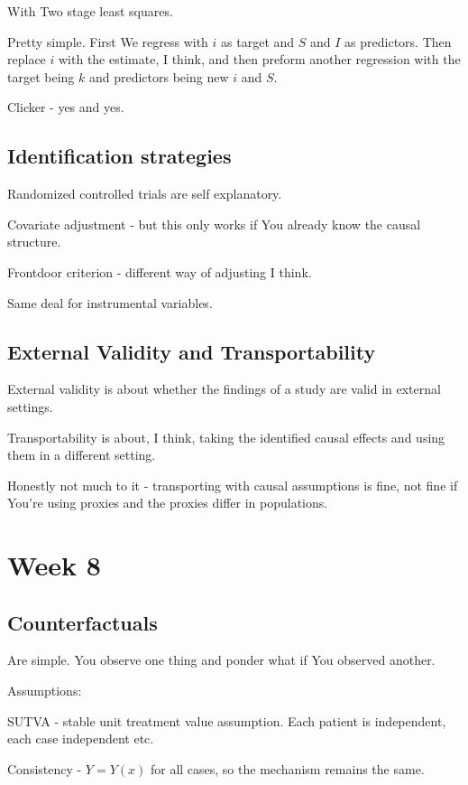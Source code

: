 \documentclass{article}
\begin{document}
		With Two stage least squares.
		
		Pretty simple. First We regress with $i$ as target and $S$ and $I$ as predictors. Then replace $i$ with the estimate, I think, and then preform another regression with the target being $k$ and predictors being new $i$ and $S$.
		 
		Clicker - yes and yes.
		
	\subsection{Identification strategies}
	
		Randomized controlled trials are self explanatory.
		
		Covariate adjustment - but this only works if You already know the causal structure.
		
		Frontdoor criterion - different way of adjusting I think.
		
		Same deal for instrumental variables.
		
	\subsection{External Validity and Transportability}
		
		External validity is about whether the findings of a study are valid in external settings.
		
		Transportability is about, I think, taking the identified causal effects and using them in a different setting.
		
		Honestly not much to it - transporting with causal assumptions is fine, not fine if You're using proxies and the proxies differ in populations.
		
\section{Week 8}

	\subsection{Counterfactuals}
	
		Are simple. You observe one thing and ponder what if You observed another.
		
		Assumptions:
		
		SUTVA - stable unit treatment value assumption. Each patient is independent, each case independent etc.
		
		Consistency - $Y=Y(x)$ for all cases, so the mechanism remains the same.
		
\end{document}
